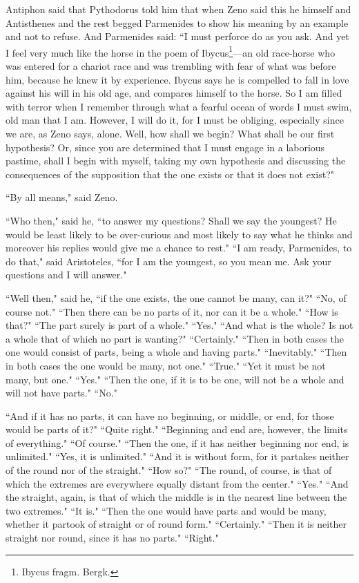 \documentclass[letterpaper,12pt]{article}
\newcommand{\stephpag}[1]{\marginnote{\small\itshape\fontfamily{ppl}\selectfont #1}}
\begin{document}
Antiphon said that Pythodorus told him that when Zeno said this he himself and Antisthenes and the rest begged Parmenides to show his meaning by an example and not to refuse. And Parmenides said: ``I must perforce do as you ask. \stephpag{137 a} And yet I feel very much like the horse in the poem of Ibycus\footnote{Ibycus fragm. Bergk.}—an old race-horse who was entered for a chariot race and was trembling with fear of what was before him, because he knew it by experience. Ibycus says he is compelled to fall in love against his will in his old age, and compares himself to the horse. So I am filled with terror when I remember through what a fearful ocean of words I must swim, old man that I am. However, I will do it, for I must be obliging, especially since we are, as Zeno says, alone. \stephpag{b} Well, how shall we begin? What shall be our first hypothesis? Or, since you are determined that I must engage in a laborious pastime, shall I begin with myself, taking my own hypothesis and discussing the consequences of the supposition that the one exists or that it does not exist?"

``By all means," said Zeno.

``Who then," said he, ``to answer my questions? Shall we say the youngest? He would be least likely to be over-curious and most likely to say what he thinks and moreover his replies would give me a chance to rest." \stephpag{c} ``I am ready, Parmenides, to do that," said Aristoteles, ``for I am the youngest, so you mean me. Ask your questions and I will answer."

``Well then," said he, ``if the one exists, the one cannot be many, can it?" ``No, of course not." ``Then there can be no parts of it, nor can it be a whole." ``How is that?" ``The part surely is part of a whole." ``Yes." ``And what is the whole? Is not a whole that of which no part is wanting?" \stephpag{d} ``Certainly." ``Then in both cases the one would consist of parts, being a whole and having parts." ``Inevitably." ``Then in both cases the one would be many, not one." ``True." ``Yet it must be not many, but one." ``Yes." ``Then the one, if it is to be one, will not be a whole and will not have parts." ``No."

``And if it has no parts, it can have no beginning, or middle, or end, for those would be parts of it?" ``Quite right." ``Beginning and end are, however, the limits of everything." ``Of course." ``Then the one, if it has neither beginning nor end, is unlimited." ``Yes, it is unlimited." ``And it is without form, \stephpag{e} for it partakes neither of the round nor of the straight." ``How so?" ``The round, of course, is that of which the extremes are everywhere equally distant from the center." ``Yes." ``And the straight, again, is that of which the middle is in the nearest line between the two extremes." ``It is." ``Then the one would have parts and would be many, whether it partook of straight or of round form." ``Certainly." ``Then it is neither straight nor round, since it has no parts." \stephpag{138 a} ``Right."
\end{document}
